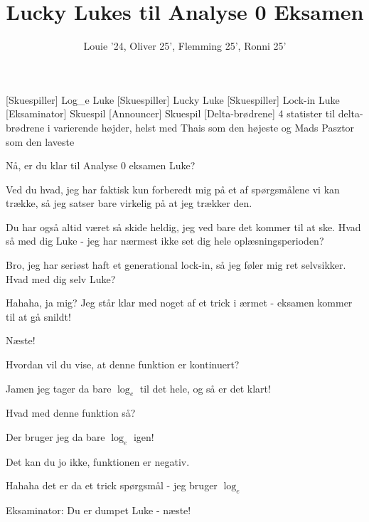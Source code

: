 \documentclass[a4paper,11pt]{article}
\title{Lucky Lukes til Analyse 0 Eksamen}
\author{Louie '24, Oliver 25', Flemming 25', Ronni 25'}
\begin{document}
\maketitle

\begin{roles}
[Skuespiller] Log\_e Luke
[Skuespiller] Lucky Luke
[Skuespiller] Lock-in Luke
[Eksaminator] Skuespil
[Announcer] Skuespil
[Delta-brødrene] 4 statister til delta-brødrene i varierende højder, helst med Thais som den højeste og Mads Pasztor som den laveste
\end{roles}

\begin{sketch}

 Nå, er du klar til Analyse 0 eksamen Luke?

 Ved du hvad, jeg har faktisk kun forberedt mig på et af spørgsmålene vi kan trække, så jeg satser bare virkelig på at jeg trækker den.

 Du har også altid været så skide heldig, jeg ved bare det kommer til at ske. Hvad så med dig Luke - jeg har nærmest ikke set dig hele oplæsningsperioden?

  Bro, jeg har seriøst haft et generational lock-in, så jeg føler mig ret selvsikker. Hvad med dig selv Luke?

 Hahaha, ja mig? Jeg står klar med  noget af et trick i ærmet - eksamen kommer til at gå snildt!


 Næste!


 Hvordan vil du vise, at denne funktion er kontinuert?

 Jamen jeg tager da bare $\log_e$ til det hele, og så er det klart!

 Hvad med denne funktion så?

 Der bruger jeg da bare $\log_e$ igen!

 Det kan du jo ikke, funktionen er negativ.

 Hahaha det er da et trick spørgsmål - jeg bruger $\log_e$

 Eksaminator: Du er dumpet Luke - næste!


\end{sketch}
\end{document}
